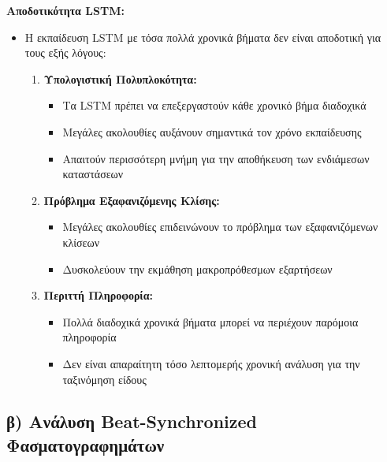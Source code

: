 \documentclass[a4paper,12pt]{article}
\begin{document}
\textbf{Αποδοτικότητα LSTM:}
\begin{itemize}
    \item Η εκπαίδευση LSTM με τόσα πολλά χρονικά βήματα δεν είναι αποδοτική για τους εξής λόγους:
          \begin{enumerate}
              \item \textbf{Υπολογιστική Πολυπλοκότητα:}
                    \begin{itemize}
                        \item Τα LSTM πρέπει να επεξεργαστούν κάθε χρονικό βήμα διαδοχικά
                        \item Μεγάλες ακολουθίες αυξάνουν σημαντικά τον χρόνο εκπαίδευσης
                        \item Απαιτούν περισσότερη μνήμη για την αποθήκευση των ενδιάμεσων καταστάσεων
                    \end{itemize}

              \item \textbf{Πρόβλημα Εξαφανιζόμενης Κλίσης:}
                    \begin{itemize}
                        \item Μεγάλες ακολουθίες επιδεινώνουν το πρόβλημα των εξαφανιζόμενων κλίσεων
                        \item Δυσκολεύουν την εκμάθηση μακροπρόθεσμων εξαρτήσεων
                    \end{itemize}

              \item \textbf{Περιττή Πληροφορία:}
                    \begin{itemize}
                        \item Πολλά διαδοχικά χρονικά βήματα μπορεί να περιέχουν παρόμοια πληροφορία
                        \item Δεν είναι απαραίτητη τόσο λεπτομερής χρονική ανάλυση για την ταξινόμηση είδους
                    \end{itemize}
          \end{enumerate}
\end{itemize}

\subsection*{β) Ανάλυση Beat-Synchronized Φασματογραφημάτων}
\end{document}
